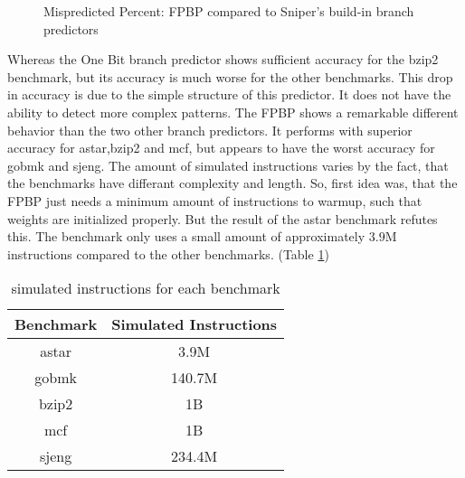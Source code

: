\documentclass{article}
\begin{document}
\begin{figure}[H]
\caption{Mispredicted Percent: FPBP compared to Sniper's\cite{carlson2014aeohmcm} build-in branch predictors}
\end{figure}
Whereas the One Bit branch predictor shows sufficient accuracy for the \textsf{bzip2} benchmark, but its accuracy is much worse for the other benchmarks. This drop in accuracy is due to the simple structure of this predictor. It does not have the ability to detect more complex patterns. The FPBP shows a remarkable different behavior than the two other branch predictors. It performs with superior accuracy for \textsf{astar},\textsf{bzip2} and \textsf{mcf}, but appears to have the worst accuracy for \textsf{gobmk} and \textsf{sjeng}. 
The amount of simulated instructions varies by the fact, that the benchmarks have differant complexity and length. So, first idea was, that the FPBP just needs a minimum amount of instructions to warmup, such that weights are initialized properly.
But the result of the \textsf{astar} benchmark refutes this. The benchmark only uses a small amount of approximately $3.9\text{M}$ instructions compared to the other benchmarks. (Table \ref{tab:instructions})

\begin{table}[H]
	\centering
\begin{tabular}{cc}
	\textbf{Benchmark} & \textbf{Simulated Instructions} \\
	\hline
	astar &  3.9M\\
	gobmk & 140.7M\\
	bzip2 & 1B\\
	mcf & 1B\\
	sjeng & 234.4M
\end{tabular}
\caption{simulated instructions for each benchmark}
\label{tab:instructions}
\end{table}
\end{document}
